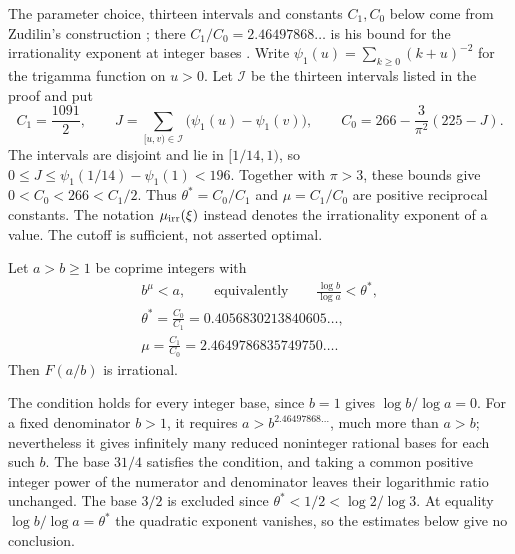\documentclass[11pt]{article}
\begin{document}
The parameter choice, thirteen intervals and constants $C_1,C_0$ below
come from Zudilin's construction
\cite[\S5, pp.~161--162]{zudilin2004}; there $C_1/C_0=2.46497868\ldots$ is
his bound for the irrationality exponent at integer bases
\cite[Thm.~1, p.~154]{zudilin2004}.
Write $\psi_1(u)=\sum_{k\ge0}(k+u)^{-2}$ for the trigamma function on
$u>0$. Let $\mathcal I$ be the thirteen
intervals listed in the proof and put
\[
 C_1=\frac{1091}{2},\qquad
 J=\sum_{[u,v)\in\mathcal I}\bigl(\psi_1(u)-\psi_1(v)\bigr),\qquad
 C_0=266-\frac3{\pi^2}(225-J).
\]
The intervals are disjoint and lie in $[1/14,1)$, so
$0\le J\le\psi_1(1/14)-\psi_1(1)<196$.
Together with $\pi>3$, these bounds give $0<C_0<266<C_1/2$.
Thus $\theta^*=C_0/C_1$ and $\mu=C_1/C_0$ are positive reciprocal
constants. The notation $\mu_{\rm irr}(\xi)$ instead denotes the
irrationality exponent of a value. The cutoff is sufficient, not asserted optimal.


\begin{theorem}
\label{res:rational-base-threshold}
Let $a>b\ge1$ be coprime integers with
\[
\begin{gathered}
 b^{\mu}<a,\qquad\text{equivalently}\qquad
 \frac{\log b}{\log a}<\theta^*,\\
 \theta^*=\frac{C_0}{C_1}=0.4056830213840605\ldots,\\
 \mu=\frac{C_1}{C_0}=2.4649786835749750\ldots.
\end{gathered}
\]
Then $F(a/b)$ is irrational.
\end{theorem}

\noindent The condition holds for every integer base, since $b=1$ gives
$\log b/\log a=0$. For a fixed denominator $b>1$, it requires
$a>b^{2.46497868\ldots}$, much more than $a>b$; nevertheless it gives
infinitely many reduced noninteger rational bases for each such $b$.
The base $31/4$ satisfies the condition, and taking a common positive
integer power of the numerator and denominator leaves their logarithmic
ratio unchanged. The base $3/2$ is excluded since $\theta^*<1/2<\log2/\log3$.
At equality $\log b/\log a=\theta^*$ the quadratic exponent vanishes,
so the estimates below give no conclusion.
\end{document}
